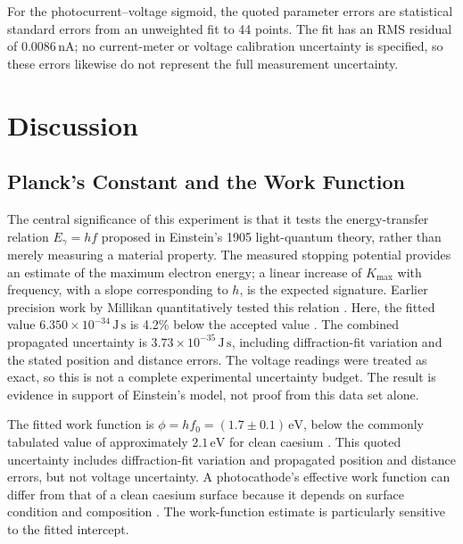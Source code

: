 \documentclass[12pt,a4paper]{article}
\begin{document}
For the photocurrent--voltage sigmoid, the quoted parameter errors are statistical standard errors from an unweighted fit to 44 points. The fit has an RMS residual of \(0.0086\,\mathrm{nA}\); no current-meter or voltage calibration uncertainty is specified, so these errors likewise do not represent the full measurement uncertainty.

\newpage

\section{Discussion}

\subsection{Planck's Constant and the Work Function}

The central significance of this experiment is that it tests the energy-transfer relation \(E_\gamma=hf\) proposed in Einstein's 1905 light-quantum theory, rather than merely measuring a material property. The measured stopping potential provides an estimate of the maximum electron energy; a linear increase of \(K_{\max}\) with frequency, with a slope corresponding to \(h\), is the expected signature. Earlier precision work by Millikan quantitatively tested this relation \cite{einstein1905,millikan1916}. Here, the fitted value \(6.350\times10^{-34}\,\mathrm{J\,s}\) is 4.2\% below the accepted value \cite{nistconstants}. The combined propagated uncertainty is \(3.73\times10^{-35}\,\mathrm{J\,s}\), including diffraction-fit variation and the stated position and distance errors. The voltage readings were treated as exact, so this is not a complete experimental uncertainty budget. The result is evidence in support of Einstein's model, not proof from this data set alone.

The fitted work function is \(\phi=hf_0=(1.7\pm0.1)\,\mathrm{eV}\), below the commonly tabulated value of approximately \(2.1\,\mathrm{eV}\) for clean caesium \cite{cesiumworkfunction}. This quoted uncertainty includes diffraction-fit variation and propagated position and distance errors, but not voltage uncertainty. A photocathode's effective work function can differ from that of a clean caesium surface because it depends on surface condition and composition \cite{cesiumworkfunction}. The work-function estimate is particularly sensitive to the fitted intercept.
\end{document}
